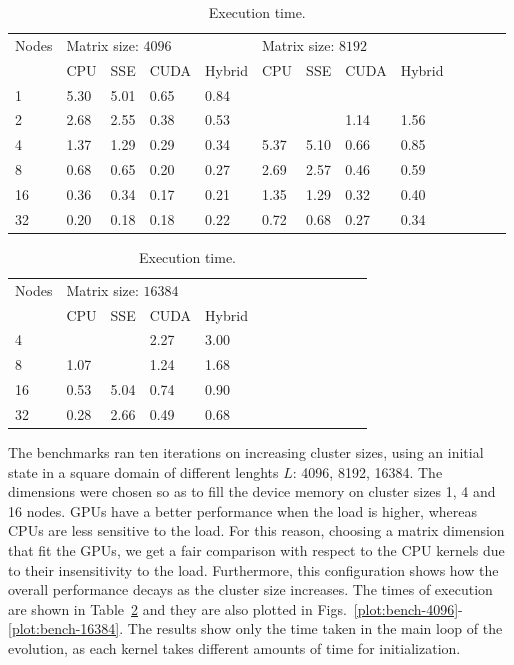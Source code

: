 \begin{table}[t!]
\centering
\begin{tabular}{*{13}{l}}
\hline
Nodes & \multicolumn{4}{l}{Matrix size: $4096$} & \multicolumn{4}{l}{Matrix size: $8192$} \\
 & CPU & SSE & CUDA & Hybrid & CPU & SSE & CUDA & Hybrid \\
\hline
1 & 5.30 & 5.01 & 0.65 & 0.84 &  & & & \\
2 & 2.68 & 2.55 & 0.38 & 0.53 &  & & 1.14 & 1.56 \\
4 & 1.37 & 1.29 & 0.29 & 0.34 & 5.37 & 5.10 & 0.66 & 0.85 \\
8 & 0.68 & 0.65 & 0.20 & 0.27 & 2.69 & 2.57 & 0.46 & 0.59 \\
16& 0.36 & 0.34 & 0.17 & 0.21 & 1.35 & 1.29 & 0.32 & 0.40 \\
32& 0.20 & 0.18 & 0.18 & 0.22 & 0.72 & 0.68 & 0.27 & 0.34 \\
\hline
\end{tabular}

\vspace*{0.5 cm}

\begin{tabular}{*{13}{l}}
\hline
Nodes & \multicolumn{4}{l}{Matrix size: $16384$} \\
 & CPU & SSE & CUDA & Hybrid \\
\hline
4 &  &  & 2.27 & 3.00 \\
8 & 1.07 &  & 1.24 & 1.68 \\
16& 0.53 & 5.04 & 0.74 & 0.90 \\
32& 0.28 & 2.66 & 0.49 & 0.68 \\
\hline
\end{tabular} \caption{Execution time.} \label{tab:bench-time}
\end{table}

The benchmarks ran ten iterations on increasing cluster sizes, using an initial state in a square domain of different lenghts $L$: 4096, 8192, 16384. The dimensions were chosen so as to fill the device memory on cluster sizes 1, 4 and 16 nodes. GPUs have a better performance when the load is higher, whereas CPUs are less sensitive to the load. For this reason, choosing a matrix dimension that fit the GPUs, we get a fair comparison with respect to the CPU kernels due to their insensitivity to the load. Furthermore, this configuration shows how the overall performance decays as the cluster size increases. The times of execution are shown in Table~\ref{tab:bench-time} and they are also plotted in Figs.~\ref{plot:bench-4096}-\ref{plot:bench-16384}.
The results show only the time taken in the main loop of the evolution, as each kernel takes different amounts of time for initialization.

